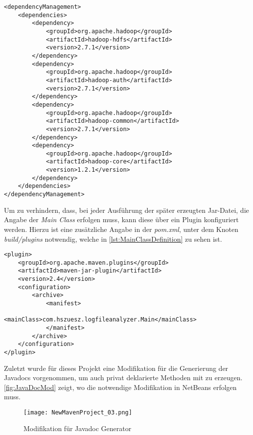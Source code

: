 \begin{lstlisting}[caption=Auszug aus der \textit{pom.xml},label=lst:PomXML]
<dependencyManagement>
	<dependencies>
		<dependency>
			<groupId>org.apache.hadoop</groupId>
			<artifactId>hadoop-hdfs</artifactId>
			<version>2.7.1</version>
		</dependency>
		<dependency>
			<groupId>org.apache.hadoop</groupId>
			<artifactId>hadoop-auth</artifactId>
			<version>2.7.1</version>
		</dependency>
		<dependency>
			<groupId>org.apache.hadoop</groupId>
			<artifactId>hadoop-common</artifactId>
			<version>2.7.1</version>
		</dependency>
		<dependency>
			<groupId>org.apache.hadoop</groupId>
			<artifactId>hadoop-core</artifactId>
			<version>1.2.1</version>
		</dependency>
	</dependencies>
</dependencyManagement>
\end{lstlisting}

Um zu verhindern, dass, bei jeder Ausführung der später erzeugten Jar-Datei, die Angabe der \textit{Main Class} erfolgen muss, kann diese über ein \gls{Plugin} konfiguriert werden. Hierzu ist eine zusätzliche Angabe in der \textit{pom.xml}, unter dem Knoten \textit{build/plugins} notwendig, welche in \autoref{lst:MainClassDefinition} zu sehen ist. \\

\pagebreak
\begin{lstlisting}[caption=Definition der \textit{Main Class} des Projektes,label=lst:MainClassDefinition]
<plugin>
	<groupId>org.apache.maven.plugins</groupId>
	<artifactId>maven-jar-plugin</artifactId>
	<version>2.4</version>
	<configuration>
		<archive>
			<manifest>
				<mainClass>com.hszuesz.logfileanalyzer.Main</mainClass>
			</manifest>
		</archive>
	</configuration>
</plugin>
\end{lstlisting}

Zuletzt wurde für dieses Projekt eine Modifikation für die Generierung der Javadocs vorgenommen, um auch privat deklarierte Methoden mit zu erzeugen. \autoref{fig:JavaDocMod} zeigt, wo die notwendige Modifikation in \gls{NetBeans} erfolgen muss.

\begin{figure}[h]
	\texttt{[image: NewMavenProject\_03.png]}
	\caption{Modifikation für Javadoc Generator}
	\label{fig:JavaDocMod}
\end{figure}

